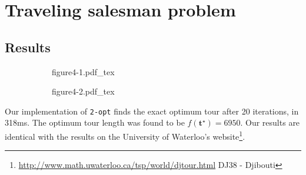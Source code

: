 \documentclass[11pt,oneside]{article}
\newcommand{\vect}[1]{\boldsymbol{#1}}
\begin{document}
\section{Traveling salesman problem}

\subsection{Results}

\begin{figure}[h!]
    \caption{Using 2-opt to for \texttt{dj38}}
    \centering
    \begin{subfigure}{0.5\textwidth}%
        \centering
        \def\svgwidth{\textwidth}
        {figure4-1.pdf_tex}
    \end{subfigure}%
    \begin{subfigure}{0.5\textwidth}%
        \centering
        \def\svgwidth{\textwidth}
        {figure4-2.pdf_tex}
    \end{subfigure}%
\end{figure}

Our implementation of \texttt{2-opt} finds the exact optimum tour
after 20 iterations, in 318ms. The optimum tour length was found to
be $f(\vect{t}^\star)= 6950$. Our results are identical with the results on the University
of Waterloo's website\footnote{
    \href{http://www.math.uwaterloo.ca/tsp/world/djtour.html}
    {http://www.math.uwaterloo.ca/tsp/world/djtour.html}
    DJ38 - Djibouti
}.
\end{document}
